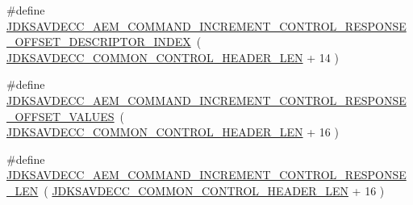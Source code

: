 \begin{DoxyCompactItemize}
\item 
\#define \hyperlink{group__command__increment__control__response_gaae7ed7cd323304753f643174cb2de60c}{J\+D\+K\+S\+A\+V\+D\+E\+C\+C\+\_\+\+A\+E\+M\+\_\+\+C\+O\+M\+M\+A\+N\+D\+\_\+\+I\+N\+C\+R\+E\+M\+E\+N\+T\+\_\+\+C\+O\+N\+T\+R\+O\+L\+\_\+\+R\+E\+S\+P\+O\+N\+S\+E\+\_\+\+O\+F\+F\+S\+E\+T\+\_\+\+D\+E\+S\+C\+R\+I\+P\+T\+O\+R\+\_\+\+I\+N\+D\+EX}~( \hyperlink{group__jdksavdecc__avtp__common__control__header_gaae84052886fb1bb42f3bc5f85b741dff}{J\+D\+K\+S\+A\+V\+D\+E\+C\+C\+\_\+\+C\+O\+M\+M\+O\+N\+\_\+\+C\+O\+N\+T\+R\+O\+L\+\_\+\+H\+E\+A\+D\+E\+R\+\_\+\+L\+EN} + 14 )
\item 
\#define \hyperlink{group__command__increment__control__response_gacf5d7937e4fe01cae1970c7f035ac8f5}{J\+D\+K\+S\+A\+V\+D\+E\+C\+C\+\_\+\+A\+E\+M\+\_\+\+C\+O\+M\+M\+A\+N\+D\+\_\+\+I\+N\+C\+R\+E\+M\+E\+N\+T\+\_\+\+C\+O\+N\+T\+R\+O\+L\+\_\+\+R\+E\+S\+P\+O\+N\+S\+E\+\_\+\+O\+F\+F\+S\+E\+T\+\_\+\+V\+A\+L\+U\+ES}~( \hyperlink{group__jdksavdecc__avtp__common__control__header_gaae84052886fb1bb42f3bc5f85b741dff}{J\+D\+K\+S\+A\+V\+D\+E\+C\+C\+\_\+\+C\+O\+M\+M\+O\+N\+\_\+\+C\+O\+N\+T\+R\+O\+L\+\_\+\+H\+E\+A\+D\+E\+R\+\_\+\+L\+EN} + 16 )
\item 
\#define \hyperlink{group__command__increment__control__response_ga648e0b55b344245b6277609346f3138b}{J\+D\+K\+S\+A\+V\+D\+E\+C\+C\+\_\+\+A\+E\+M\+\_\+\+C\+O\+M\+M\+A\+N\+D\+\_\+\+I\+N\+C\+R\+E\+M\+E\+N\+T\+\_\+\+C\+O\+N\+T\+R\+O\+L\+\_\+\+R\+E\+S\+P\+O\+N\+S\+E\+\_\+\+L\+EN}~( \hyperlink{group__jdksavdecc__avtp__common__control__header_gaae84052886fb1bb42f3bc5f85b741dff}{J\+D\+K\+S\+A\+V\+D\+E\+C\+C\+\_\+\+C\+O\+M\+M\+O\+N\+\_\+\+C\+O\+N\+T\+R\+O\+L\+\_\+\+H\+E\+A\+D\+E\+R\+\_\+\+L\+EN} + 16 )
\end{DoxyCompactItemize}
